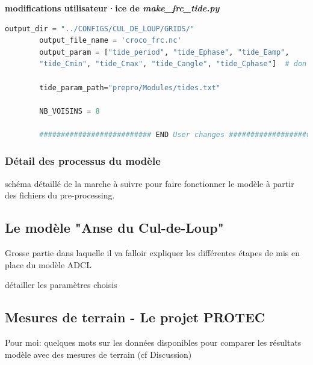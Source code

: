\documentclass[10pt,a4paper,titlepage]{article}
\begin{document}
\begin{codeEnv}{\textbf{modifications utilisateur·ice de \textit{make\_frc\_tide.py}}}
\begin{lstlisting}[language=python]
        output_dir = "../CONFIGS/CUL_DE_LOUP/GRIDS/"
        output_file_name = 'croco_frc.nc'
        output_param = ["tide_period", "tide_Ephase", "tide_Eamp",
        "tide_Cmin", "tide_Cmax", "tide_Cangle", "tide_Cphase"]  # don't change the order

        tide_param_path="prepro/Modules/tides.txt"

        NB_VOISINS = 8

        ########################## END User changes ##########################
    \end{lstlisting}
\end{codeEnv}

\subsubsection{Détail des processus du modèle}
schéma détaillé de la marche à suivre pour faire fonctionner le modèle à partir des fichiers du pre-processing.

\subsection{Le modèle "Anse du Cul-de-Loup"}

Grosse partie dans laquelle il va falloir expliquer les différentes étapes de mis en place du modèle ADCL

détailler les paramètres choisis

\subsection{Mesures de terrain - Le projet PROTEC}

Pour moi: quelques mots sur les données disponibles pour comparer les résultats modèle avec des mesures de terrain (cf Discussion)


\printbibliography
\end{document}
